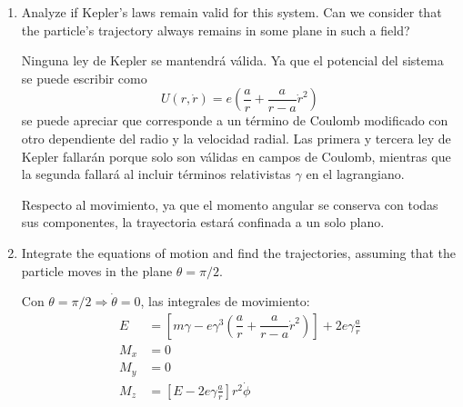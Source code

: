 \documentclass[]{article}
\numberwithin{equation}{section}
\newcommand{\0}{\textcolor{gray}{0}}
\begin{document}
\begin{enumerate}
\begin{enumerate}
\begin{alignat*}{2}
			E &= &&\left[m \gamma - e \gamma^3 \left(\dfrac{a}{r} + \dfrac{a}{r - a}\dot{r}^2\right)\right] + 2 e \gamma \frac{a}{r}\\
			M_x &= -&&\left[E - 2 e \gamma \frac{a}{r}\right] r^2 \left( \dot{\theta}\sin\phi + \dot{\phi}\sin\theta\cos\theta\cos\phi \right)\\
			M_y &= &&\left[E - 2 e \gamma \frac{a}{r}\right] r^2 \left( \dot{\theta}\cos\phi - \dot{\phi}\sin\theta\cos\theta\sin\phi \right)\\
			M_z &= &&\left[E - 2 e \gamma \frac{a}{r}\right] r^2 \dot{\phi} \sin^2\theta
		\end{alignat*}
		
		\item[ii.] Analyze if Kepler's laws remain valid for this system. Can we consider that the particle's trajectory always remains in some plane in such a field?
		
		Ninguna ley de Kepler se mantendrá válida. Ya que el potencial del sistema se puede escribir como
		\begin{equation}
			U(r,\dot{r}) = e \left(\frac{a}{r} + \frac{a}{r - a}\dot{r}^2\right)
		\end{equation}
		se puede apreciar que corresponde a un término de Coulomb modificado con otro dependiente del radio y la velocidad radial. Las primera y tercera ley de Kepler fallarán porque solo son válidas en campos de Coulomb, mientras que la segunda fallará al incluir términos relativistas \(\gamma\) en el lagrangiano.
		
		Respecto al movimiento, ya que el momento angular se conserva con todas sus componentes, la trayectoria estará confinada a un solo plano.
		
		\item[iii.] Integrate the equations of motion and find the trajectories, assuming that the particle moves in the plane \(\theta = \pi/2\).
		
		Con \(\theta = \pi/2 \Rightarrow \dot{\theta} = 0\), las integrales de movimiento:
		\begin{align*}
			E   &= \left[m \gamma - e \gamma^3 \left(\dfrac{a}{r} + \dfrac{a}{r - a}\dot{r}^2\right)\right] + 2 e \gamma \frac{a}{r}\\
			M_x &= 0\\
			M_y &= 0\\
			M_z &= \left[E - 2 e \gamma \frac{a}{r}\right] r^2 \dot{\phi}
		\end{align*}
		

\end{enumerate}
\end{enumerate}
\end{document}
